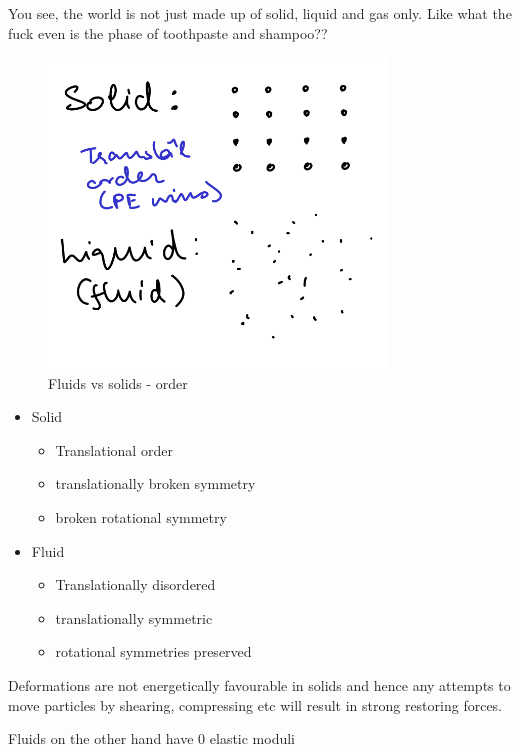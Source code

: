 \documentclass[a4paper]{article}
\begin{document}
You see, the world is not just made up of solid, liquid and gas only.
Like what the fuck even is the phase of toothpaste and shampoo??

\begin{figure}[h]
	\centering
	\includegraphics[width=0.8\textwidth]{figures/order.png}
	\caption{Fluids vs solids - order}
	\label{fig:figures-order-png}
\end{figure}

\begin{itemize}
	\item Solid
		\begin{itemize}
			\item Translational order
			\item translationally broken symmetry
			\item  broken rotational symmetry
		\end{itemize}
	\item Fluid
		\begin{itemize}
			\item Translationally disordered
			\item translationally symmetric
			\item rotational symmetries  preserved
		\end{itemize}
\end{itemize}

Deformations are not energetically favourable in solids and hence
any attempts to move  particles by shearing, compressing etc will
result in strong restoring forces.

Fluids on the other hand have 0 elastic moduli
\end{document}
